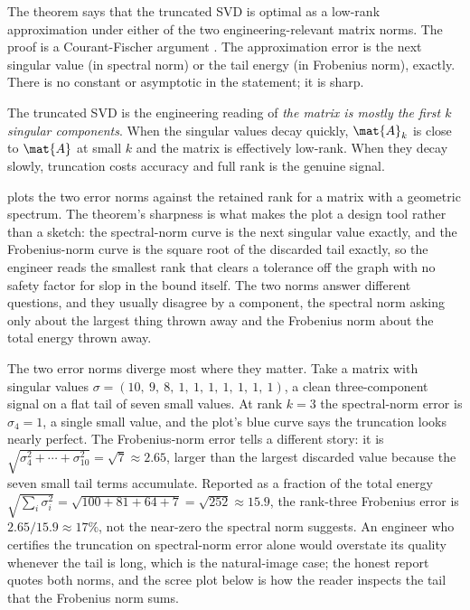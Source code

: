 The theorem says that the truncated SVD is optimal as a low-rank
approximation under either of the two engineering-relevant matrix
norms. The proof is a Courant-Fischer argument
\cite[ch.~5]{text:trefethen-bau1997}. The approximation error is
the next singular value (in spectral norm) or the tail energy (in
Frobenius norm), exactly. There is no constant or asymptotic in the
statement; it is sharp.

The truncated SVD is the engineering reading of \emph{the matrix is
mostly the first $k$ singular components}. When the singular values
decay quickly, $\mat{A}_{k}$ is close to $\mat{A}$ at small $k$ and
the matrix is effectively low-rank. When they decay slowly,
truncation costs accuracy and full rank is the genuine signal.



 plots the two error norms
against the retained rank for a matrix with a geometric spectrum. The
theorem's sharpness is what makes the plot a design tool rather than a
sketch: the spectral-norm curve is the next singular value exactly, and
the Frobenius-norm curve is the square root of the discarded tail
exactly, so the engineer reads the smallest rank that clears a
tolerance off the graph with no safety factor for slop in the bound
itself. The two norms answer different questions, and they usually
disagree by a component, the spectral norm asking only about the
largest thing thrown away and the Frobenius norm about the total energy
thrown away.

\begin{example}
The two error norms diverge most where they matter. Take a matrix with
singular values $\sigma = (10,\ 9,\ 8,\ 1,\ 1,\ 1,\ 1,\ 1,\ 1,\ 1)$, a
clean three-component signal on a flat tail of seven small values. At
rank $k = 3$ the spectral-norm error is $\sigma_{4} = 1$, a single
small value, and the plot's blue curve says the truncation looks nearly
perfect. The Frobenius-norm error tells a different story: it is
$\sqrt{\sigma_{4}^{2} + \cdots + \sigma_{10}^{2}} = \sqrt{7} \approx
2.65$, larger than the largest discarded value because the seven small
tail terms accumulate. Reported as a fraction of the total energy
$\sqrt{\sum_i \sigma_i^2} = \sqrt{100 + 81 + 64 + 7} = \sqrt{252}
\approx 15.9$, the rank-three Frobenius error is $2.65/15.9 \approx
17\%$, not the near-zero the spectral norm suggests. An engineer who
certifies the truncation on spectral-norm error alone would overstate
its quality whenever the tail is long, which is the natural-image case;
the honest report quotes both norms, and the scree plot below is how
the reader inspects the tail that the Frobenius norm sums.
\end{example}

